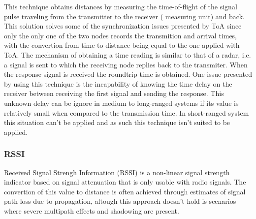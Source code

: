 This technique obtains distances by measuring the time-of-flight of the signal pulse traveling from the transmitter to the receiver ( measuring unit) and back. This solution solves some of the synchronization issues presented by \ac{ToA} since only the only one of the two nodes records the transmition and arrival times, with the convertion from time to distance being equal to the one applied with \ac{ToA}. The mechanism of obtaining a time reading is similar to that of a radar, i.e. a signal is sent to which the receiving node replies back to the transmiter. When the response signal is received the roundtrip time is obtained. One issue presented by using this technique is the incapability of knowing the time delay on the receiver between receiving the first signal and sending the response. This unknown delay can be ignore in medium to long-ranged systems if its value is relatively small when compared to the transmission time. In short-ranged system this situation can't be applied and as such this technique isn't suited to be applied.


\subsubsection{ \ac{RSSI}}
\label{subsubsec:rssi}

Received Signal Strengh Information (RSSI) is a non-linear signal strength indicator based on signal attenuation that is only usable with radio signals. The convertion of this value to distance is often achieved through estimates of signal path loss due to propagation, altough this approach doesn't hold is scenarios where severe multipath effects and shadowing are present.



